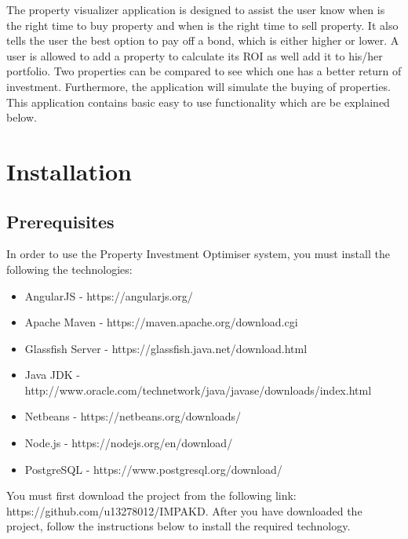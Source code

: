 \documentclass[a4paper,12pt]{article}
\begin{document}
The property visualizer application is designed to assist the user know when is the right time to buy property and when is the right time to sell property. It also tells the user the best option to pay off a bond, which is either higher or lower. A user is allowed to add a property to calculate its ROI as well add it to his/her portfolio. Two properties can be compared to see which one has a better return of investment. Furthermore, the application will simulate the buying of properties. This application contains basic easy to use functionality which are be explained below.
\section{Installation}

\subsection{Prerequisites}
In order to use the Property Investment Optimiser system, you must install the following the technologies:
\begin{itemize}
\item{AngularJS - https://angularjs.org/}
\item{Apache Maven - https://maven.apache.org/download.cgi}
\item{Glassfish Server - https://glassfish.java.net/download.html}
\item{Java JDK - http://www.oracle.com/technetwork/java/javase/downloads/index.html}
\item{Netbeans - https://netbeans.org/downloads/}
\item{Node.js - https://nodejs.org/en/download/}
\item{PostgreSQL - https://www.postgresql.org/download/}
\end{itemize}
You must first download the project from the following link: https://github.com/u13278012/IMPAKD. After you have downloaded the project, follow the instructions below to install the required technology.
\end{document}
